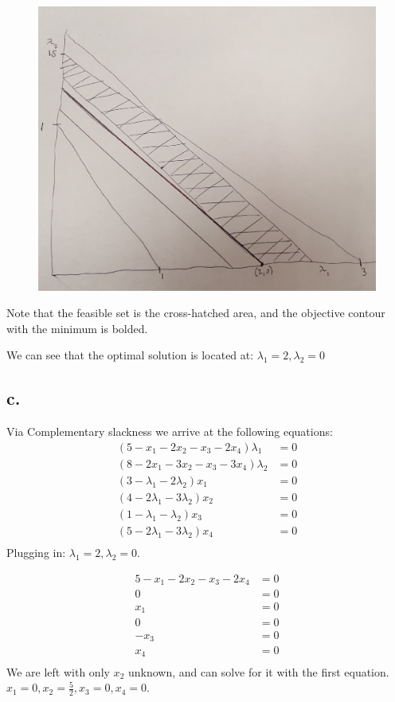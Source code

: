 \documentclass[10pt, letterpaper]{paper}
\begin{document}
\begin{figure}[H]
\centering
\includegraphics[width=1.0\textwidth]{shittygraph.jpeg}
\end{figure}

Note that the feasible set is the cross-hatched area, and the objective contour with the minimum is bolded.

We can see that the optimal solution is located at: $\lambda_1 = 2, \lambda_2 = 0$
\subsection*{c.}
Via Complementary slackness we arrive at the following equations:
\begin{eqnarray*}
(5 - x_1 - 2x_2 -x_3 - 2x_4 )\lambda_1 &= 0\\
(8 - 2x_1 - 3x_2 -x_3 -3x_4)\lambda_2 &= 0\\
(3 - \lambda_1- 2\lambda_2) x_1 &= 0\\
(4- 2\lambda_1 - 3\lambda_2 )x_2 &= 0\\
(1 - \lambda_1 - \lambda_2 )x_3 &= 0\\
(5 - 2\lambda_1 - 3\lambda_2)x_4 &= 0\\
\end{eqnarray*}
Plugging in: $\lambda_1 = 2, \lambda_2 = 0$.

\begin{eqnarray*}
5 - x_1 - 2x_2 - x_3 - 2x_4 &= 0 \\
0 &= 0\\
x_1 &= 0\\
0 &= 0\\
-x_3 &= 0\\
x_4 &= 0\\
\end{eqnarray*}
We are left with only $x_2$ unknown, and can solve for it with the first equation.
\newline
$x_1 = 0, x_2 = \frac{5}{2}, x_3 = 0,x_4 = 0$.
\end{document}
